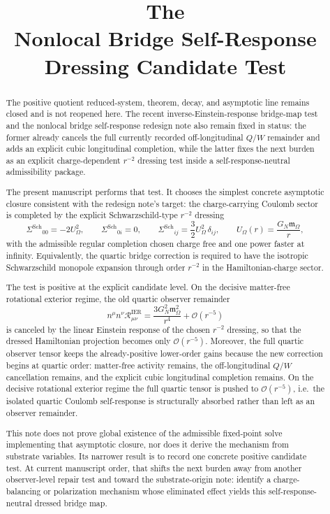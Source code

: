 \documentclass[11pt]{article}
\title{\textbf{The \TheoryName{}}\\[0.4em]
\large Nonlocal Bridge Self-Response Dressing Candidate Test}
\author{}
\date{}
\newcommand{\SigmaDressSch}{\Sigma^{\mathrm{Sch}}}
\newcommand{\HamChargeOmega}{\mathfrak m_{\Omega}}
\begin{document}
\maketitle

\begin{abstract}
The positive quotient reduced-system, theorem, decay, and asymptotic line remains closed and is not reopened here. The recent inverse-Einstein-response bridge-map test and the nonlocal bridge self-response redesign note also remain fixed in status: the former already cancels the full currently recorded off-longitudinal \(Q/W\) remainder and adds an explicit cubic longitudinal completion, while the latter fixes the next burden as an explicit charge-dependent \(r^{-2}\) dressing test inside a self-response-neutral admissibility package.

The present manuscript performs that test. It chooses the simplest concrete asymptotic closure consistent with the redesign note's target: the charge-carrying Coulomb sector is completed by the explicit Schwarzschild-type \(r^{-2}\) dressing
\[
\SigmaDressSch{}_{00}=-2U_\Omega^2,
\qquad
\SigmaDressSch{}_{0i}=0,
\qquad
\SigmaDressSch{}_{ij}=\frac32 U_\Omega^2\,\delta_{ij},
\qquad
U_\Omega(r)=\frac{G_N\HamChargeOmega}{r},
\]
with the admissible regular completion chosen charge free and one power faster at infinity. Equivalently, the quartic bridge correction is required to have the isotropic Schwarzschild monopole expansion through order \(r^{-2}\) in the Hamiltonian-charge sector.

The test is positive at the explicit candidate level. On the decisive matter-free rotational exterior regime, the old quartic observer remainder
\[
n^\mu n^\nu \mathcal R_{\mu\nu}^{\mathrm{IER}}
=
\frac{3G_N^2\HamChargeOmega^2}{r^4}
+\mathcal O(r^{-5})
\]
is canceled by the linear Einstein response of the chosen \(r^{-2}\) dressing, so that the dressed Hamiltonian projection becomes only \(\mathcal O(r^{-5})\). Moreover, the full quartic observer tensor keeps the already-positive lower-order gains because the new correction begins at quartic order: matter-free activity remains, the off-longitudinal \(Q/W\) cancellation remains, and the explicit cubic longitudinal completion remains. On the decisive rotational exterior regime the full quartic tensor is pushed to \(\mathcal O(r^{-5})\), i.e.\ the isolated quartic Coulomb self-response is structurally absorbed rather than left as an observer remainder.

This note does not prove global existence of the admissible fixed-point solve implementing that asymptotic closure, nor does it derive the mechanism from substrate variables. Its narrower result is to record one concrete positive candidate test. At current manuscript order, that shifts the next burden away from another observer-level repair test and toward the substrate-origin note: identify a charge-balancing or polarization mechanism whose eliminated effect yields this self-response-neutral dressed bridge map.
\end{abstract}
\end{document}
